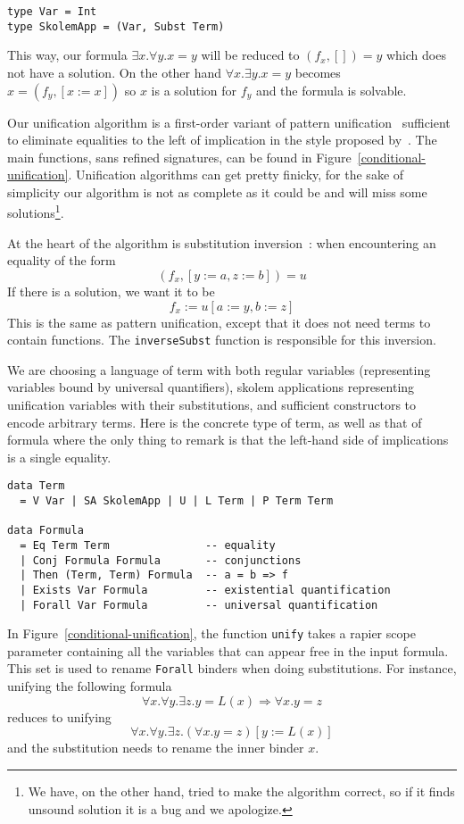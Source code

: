 \documentclass[sigconf, review]{acmart}
\newcommand{\tc}[1]{{\small\texttt{#1}}}
\begin{document}
\begin{verbatim}
type Var = Int
type SkolemApp = (Var, Subst Term)
\end{verbatim}

This way, our formula $\exists x. \forall y. x=y$ will be reduced to
$(f_{x},[]) = y$ which does not have a solution. On the other hand
$\forall x. \exists y. x = y$ becomes $x = (f_{y}, [x:=x])$ so $x$ is a solution
for $f_{y}$ and the formula is solvable.

Our unification algorithm is a first-order variant of pattern
unification~\cite{miller91-pattern} sufficient to eliminate equalities to the
left of implication in the style proposed by~\citet{miller22}. The main
functions, sans refined signatures, can be found in
Figure~\ref{conditional-unification}. Unification algorithms can get pretty
finicky, for the sake of simplicity our algorithm is not as complete as it could
be and will miss some solutions\footnote{We have, on the other hand, tried to
  make the algorithm correct, so if it finds unsound solution it is a bug and we
  apologize.}.

At the heart of the algorithm is substitution inversion~\cite{ziliani15}: when
encountering an equality of the form
$$(f_{x},[y:=a, z:=b]) = u$$
If there is a solution, we want it to be
$$f_{x} := u[a:=y, b:=z]$$
This is the same as pattern unification, except that it does not need terms to
contain functions. The \tc{inverseSubst} function is responsible for this
inversion.

We are choosing a language of term with both regular variables (representing
variables bound by universal quantifiers), skolem applications representing
unification variables with their substitutions, and sufficient
constructors to encode arbitrary terms. Here is the concrete type of term, as
well as that of formula where the only thing to remark is that the left-hand
side of implications is a single equality.

\begin{verbatim}
data Term
  = V Var | SA SkolemApp | U | L Term | P Term Term

data Formula
  = Eq Term Term               -- equality
  | Conj Formula Formula       -- conjunctions
  | Then (Term, Term) Formula  -- a = b => f
  | Exists Var Formula         -- existential quantification
  | Forall Var Formula         -- universal quantification
\end{verbatim}

In Figure~\ref{conditional-unification}, the function \tc{unify} takes a rapier scope parameter containing all the variables that
can appear free in the input formula. This set is used to rename \tc{Forall}
binders when doing substitutions. For instance, unifying the following formula
$$\forall x. \forall y. \exists z. y = L(x) \Rightarrow \forall x. y = z$$
reduces to unifying
$$\forall x. \forall y. \exists z. (\forall x. y = z)[y:=L(x)]$$
and the substitution needs to rename the inner binder $x$.
\end{document}
